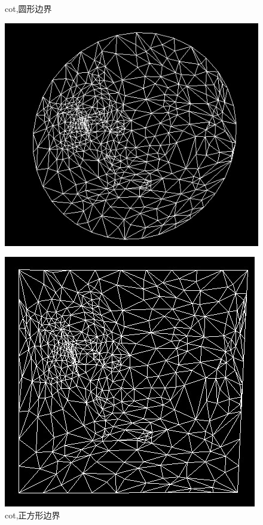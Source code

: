 \documentclass{article}
\begin{document}
	\begin{figure}[htbp]
		\centering
		\begin{minipage}{0.24\linewidth}
			\centering
			\caption{cot,圆形边界}
			\includegraphics[width=1\linewidth]{lsis_circle.JPG}
			\label{chutian1}%
		\end{minipage}
		\begin{minipage}{0.24\linewidth}
			\centering
			\caption{cot,正方形边界}
			\includegraphics[width=1\linewidth]{lsis_square.JPG}

\end{minipage}
\end{figure}
\end{document}
